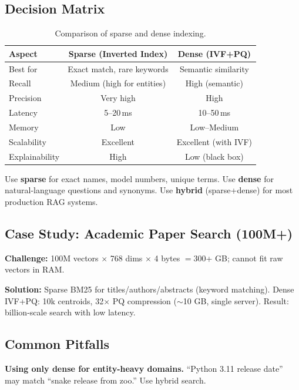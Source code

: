 \documentclass[11pt,a4paper]{article}
\theoremstyle{definition}
\theoremstyle{plain}
\begin{document}
\subsection{Decision Matrix}

\begin{table}[ht]
\centering
\caption{Comparison of sparse and dense indexing.}
\begin{tabular}{lcc}
\toprule
\textbf{Aspect} & \textbf{Sparse (Inverted Index)} & \textbf{Dense (IVF+PQ)} \\
\midrule
Best for & Exact match, rare keywords & Semantic similarity \\
Recall & Medium (high for entities) & High (semantic) \\
Precision & Very high & High \\
Latency & 5--20\,ms & 10--50\,ms \\
Memory & Low & Low--Medium \\
Scalability & Excellent & Excellent (with IVF) \\
Explainability & High & Low (black box) \\
\bottomrule
\end{tabular}
\end{table}

\begin{production}
Use \textbf{sparse} for exact names, model numbers, unique terms. Use \textbf{dense} for natural-language questions and synonyms. Use \textbf{hybrid} (sparse+dense) for most production RAG systems.
\end{production}

\subsection{Case Study: Academic Paper Search (100M+)}

\textbf{Challenge:} 100M vectors $\times$ 768 dims $\times$ 4 bytes $= 300$+ GB; cannot fit raw vectors in RAM.

\textbf{Solution:} Sparse BM25 for titles/authors/abstracts (keyword matching). Dense IVF+PQ: 10k centroids, 32$\times$ PQ compression ($\sim$10 GB, single server). Result: billion-scale search with low latency.

\subsection{Common Pitfalls}

\begin{pitfall}
\textbf{Using only dense for entity-heavy domains.} ``Python 3.11 release date'' may match ``snake release from zoo.'' Use hybrid search.
\end{pitfall}
\end{document}
